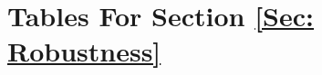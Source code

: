 \documentclass[mnsc,blindrev]{informs3}
\begin{document}
	
	
	
	
\section{Tables For Section \ref{Sec: Robustness}}	

		
		
		

		
		
%		


		
        
	

	
	

	
	
	
	
	
\end{document}
